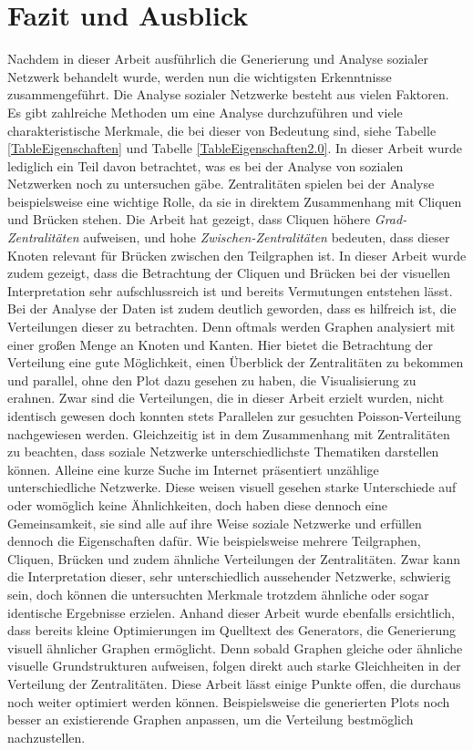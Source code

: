 \chapter{Fazit und Ausblick}\label{ch:fazit}

Nachdem in dieser Arbeit ausführlich die Generierung und Analyse sozialer Netzwerk behandelt wurde, werden nun die wichtigsten Erkenntnisse zusammengeführt. Die Analyse sozialer Netzwerke besteht aus vielen Faktoren. Es gibt zahlreiche Methoden um eine Analyse durchzuführen und viele charakteristische Merkmale, die bei dieser von Bedeutung sind, siehe Tabelle \ref{TableEigenschaften} und Tabelle \ref{TableEigenschaften2.0}. In dieser Arbeit wurde lediglich ein Teil davon betrachtet, was es bei der Analyse von sozialen Netzwerken noch zu untersuchen gäbe. Zentralitäten spielen bei der Analyse beispielsweise eine wichtige Rolle, da sie in direktem Zusammenhang mit Cliquen und Brücken stehen. Die Arbeit hat gezeigt, dass Cliquen höhere \textit{Grad-Zentralitäten} aufweisen, und hohe \textit{Zwischen-Zentralitäten} bedeuten, dass dieser Knoten relevant für Brücken zwischen den Teilgraphen ist. In dieser Arbeit wurde zudem gezeigt, dass die Betrachtung der Cliquen und Brücken bei der visuellen Interpretation sehr aufschlussreich ist und bereits Vermutungen entstehen lässt. Bei der Analyse der Daten ist zudem deutlich geworden, dass es hilfreich ist, die Verteilungen dieser zu betrachten. Denn oftmals werden Graphen analysiert mit einer großen Menge an Knoten und Kanten. Hier bietet die Betrachtung der Verteilung eine gute Möglichkeit, einen Überblick der Zentralitäten zu bekommen und parallel, ohne den Plot dazu gesehen zu haben, die Visualisierung zu erahnen. 
Zwar sind die Verteilungen, die in dieser Arbeit erzielt wurden, nicht identisch gewesen doch konnten stets Parallelen zur gesuchten Poisson-Verteilung nachgewiesen werden.
Gleichzeitig ist in dem Zusammenhang mit Zentralitäten zu beachten, dass soziale Netzwerke unterschiedlichste Thematiken darstellen können. Alleine eine kurze Suche im Internet präsentiert unzählige unterschiedliche Netzwerke. Diese weisen visuell gesehen starke Unterschiede auf oder womöglich keine Ähnlichkeiten, doch haben diese dennoch eine Gemeinsamkeit, sie sind alle auf ihre Weise soziale Netzwerke und erfüllen dennoch die Eigenschaften dafür. Wie beispielsweise mehrere Teilgraphen, Cliquen, Brücken und zudem ähnliche Verteilungen der Zentralitäten. Zwar kann die Interpretation dieser, sehr unterschiedlich aussehender Netzwerke, schwierig sein, doch können die untersuchten Merkmale trotzdem ähnliche oder sogar identische Ergebnisse erzielen. Anhand dieser Arbeit wurde ebenfalls ersichtlich, dass bereits kleine Optimierungen im Quelltext des Generators, die Generierung visuell ähnlicher Graphen ermöglicht. Denn sobald Graphen gleiche oder ähnliche visuelle Grundstrukturen aufweisen, folgen direkt auch starke Gleichheiten in der Verteilung der Zentralitäten. Diese Arbeit lässt einige Punkte offen, die durchaus noch weiter optimiert werden können. Beispielsweise die generierten Plots noch besser an existierende Graphen anpassen, um die Verteilung bestmöglich nachzustellen. 
